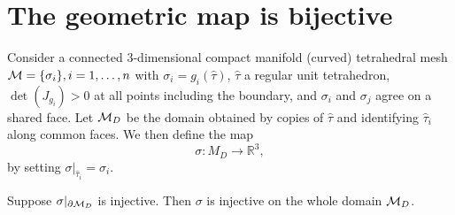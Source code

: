 \section{The geometric map is bijective}\label{sec:bij-proof}

Consider a connected 3-dimensional compact manifold {(curved)} tetrahedral mesh $\mathcal{M} = \{\sigma_i \}, i=1,\dots,n$ with
$\sigma_i = g_i(\hat \tau)$, $\hat \tau$ a regular unit tetrahedron, $\det(J_{g_i}) > 0$ at all points including the boundary, and $\sigma_i$ and $\sigma_j$ agree on a shared face. 
%
Let $\mathcal{M}_D$ be the domain obtained by copies of  $\hat \tau$ and identifying $\hat \tau_i$ along common faces. We then define the map 
\[
\sigma\colon M_D \to \mathbb{R}^3,
\]
by setting $\sigma|_{\hat \tau_i} = \sigma_i$.

\begin{proposition}
Suppose $\sigma|_{\partial\mathcal{M}_D}$ is injective. Then $\sigma$ is injective on the whole domain $\mathcal{M}_D$. 
\end{proposition}
